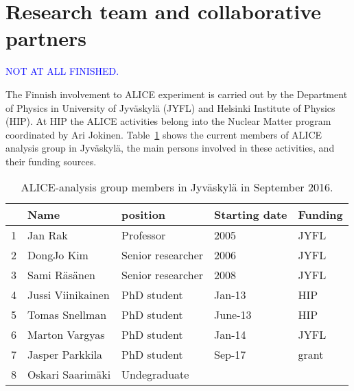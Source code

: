 
\section{Research team and collaborative partners} %
\label{sec:reseachteam}

\textcolor{blue}{NOT AT ALL FINISHED.}

The Finnish involvement to ALICE experiment is carried out by the Department of Physics in University of Jyv\"askyl\"a (JYFL) and Helsinki Institute of Physics (HIP). At HIP the ALICE activities belong into the Nuclear Matter program coordinated by Ari Jokinen. Table~\ref{tab:personnel} shows the current members of ALICE analysis group in Jyv\"askyl\"a, the main persons involved in these activities, and their funding sources.

\begin{table}[htp]
\caption{ALICE-analysis group members in Jyv\"askyl\"a in September 2016.}
\begin{center}
\begin{tabular}{|l|l|l|l|l|}
\hline
   &  Name                       &  position         & Starting date & Funding \\
\hline
1 &    Jan  Rak                  & Professor       &  2005           & JYFL \\
2 &    DongJo   Kim          & Senior researcher     &  2006 & JYFL \\
3 &    Sami   R\"as\"anen & Senior researcher     &  2008 & JYFL \\
 \hline
4 &    Jussi   Viinikainen   & PhD student   & Jan-13         & HIP \\
5 &    Tomas Snellman     & PhD student   & June-13       & HIP \\
6 &    Marton Vargyas      & PhD student   & Jan-14         & JYFL \\
7 &    Jasper Parkkila       & PhD student   & Sep-17         & grant \\
\hline
8 &    Oskari Saarim\"aki & Undegraduate   &          &  \\
\hline
\end{tabular}
\end{center}
\label{tab:personnel}
\end{table}%

